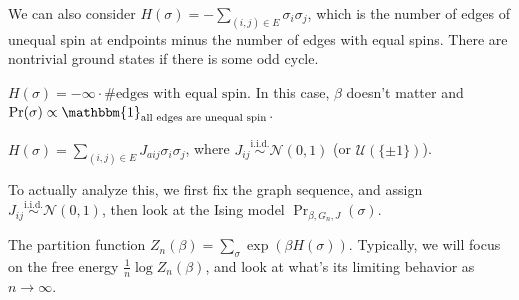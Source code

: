 \begin{eg}
	We can also consider \(H(\sigma ) = - \sum_{(i, j) \in E} \sigma _i \sigma _j\), which is the number of edges of unequal spin at endpoints minus the number of edges with equal spins. There are nontrivial ground states if there is some odd cycle.
\end{eg}

\begin{eg}
	\(H(\sigma ) = -\infty \cdot \#\text{edges with equal spin} \). In this case, \(\beta \) doesn't matter and \(\Pr (\sigma ) \propto \mathbbm{1}_{\text{all edges are unequal spin} } \).
\end{eg}

\begin{eg}
	\(H(\sigma ) = \sum_{(i, j) \in E} J_{aij} \sigma _i \sigma _j \), where \(J_{ij} \overset{\text{i.i.d.} }{\sim } \mathcal{N} (0, 1)\) (or \(\mathcal{U} (\{ \pm 1 \} )\)).

	To actually analyze this, we first fix the graph sequence, and assign \(J_{ij} \overset{\text{i.i.d.} }{\sim } \mathcal{N} (0, 1)\), then look at the Ising model \(\Pr _{\beta , G_n, J}(\sigma )\).
\end{eg}

The partition function \(Z_n(\beta ) = \sum_{\sigma } \exp (\beta H(\sigma ))\). Typically, we will focus on the free energy \(\frac{1}{n}\log Z_n(\beta )\), and look at what's its limiting behavior as \(n \to \infty \).